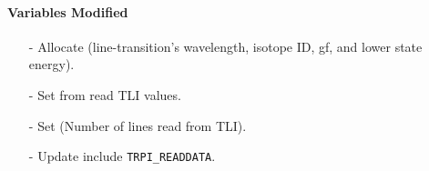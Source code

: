 \documentclass[letterpaper,12pt]{article}
\begin{document}
\paragraph{Variables Modified}
\begin{enumerate}[leftmargin=10pt, noitemsep, parsep=0pt, topsep=0ex]
\item[-] Allocate  (line-transition's wavelength,
  isotope ID, gf, and lower state energy).
\item[-] Set  from read TLI values.
\item[-] Set  (Number of lines read from TLI).
\item[-] Update  include {\tt TRPI\_READDATA}.
\end{enumerate}
\end{document}
